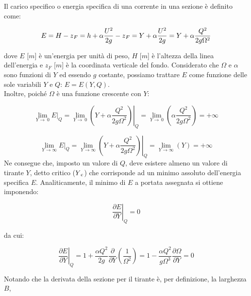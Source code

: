 \documentclass[12pt]{article} %
\begin{document}
\noindent Il carico specifico o energia specifica di una corrente in una sezione è definito come:

\begin{equation}
    E=H-z\textsubscript{$F$}=h+\alpha\frac{U^{2}}{2g}-z\textsubscript{$F$}=Y+\alpha\frac{U^{2}}{2g}=Y+\alpha\frac{Q^{2}}{2g\Omega^{2}}
    \label{eqn:E_1}
\end{equation}

\noindent dove $E$ [$m$] è un’energia per unità di peso, $H$ [$m$] è l’altezza della linea dell’energia e $z_F$ [$m$] è la coordinata verticale del fondo.
Considerato che $\Omega$ e $\alpha$ sono funzioni di $Y$ ed essendo $g$ costante, possiamo trattare $E$ come funzione delle sole variabili $Y$ e $Q$: $E=E(Y, Q)$.\\
Inoltre, poiché $\Omega$ è una funzione crescente con $Y$: 

\begin{equation}
    \lim_{Y\to\ 0} E|_{Q}=\lim_{Y\to\ 0} \left.\left(Y+\alpha\frac{Q^{2}}{2g\Omega^{2}}\right)\right|_{Q}=\lim_{Y\to\ 0} \left(\alpha \frac{Q^{2}}{2g\Omega^{2}}\right)= +\infty
    \label{eqn:E_2}
\end{equation}

\begin{equation}
    \lim_{Y\to\infty} E|_Q=\lim_{Y\to\infty} \left.\left(Y+\alpha\frac{Q^{2}}{2g\Omega^{2}}\right)\right|_Q=\lim_{Y\to\infty} (Y)= +\infty
    \label{eqn:E_3}
\end{equation}
Ne consegue che, imposto un valore di $Q$, deve esistere almeno un valore di tirante $Y$, detto critico ($Y\textsubscript{c}$) che corrisponde ad un minimo assoluto dell’energia specifica $E$.
Analiticamente, il minimo di $E$ a portata assegnata si ottiene imponendo:

\begin{equation}
    \left.\frac{\partial E}{\partial Y}\right|_Q=0
    \label{eqn:E_4}
\end{equation}

\noindent da cui:

\begin{equation}
    \left.\frac{\partial E}{\partial Y}\right|_Q=1+\frac{\alpha Q^2}{2g}\frac{\partial}{\partial Y}\left(\frac{1}{\Omega^{2}}\right)=1-\frac{\alpha Q^{2}}{g\Omega^{3}}\frac{\partial \Omega}{\partial Y}=0
    \label{eqn:E_5}
\end{equation}

\noindent Notando che la derivata della sezione per il tirante è, per definizione, la larghezza $B$,
\end{document}
